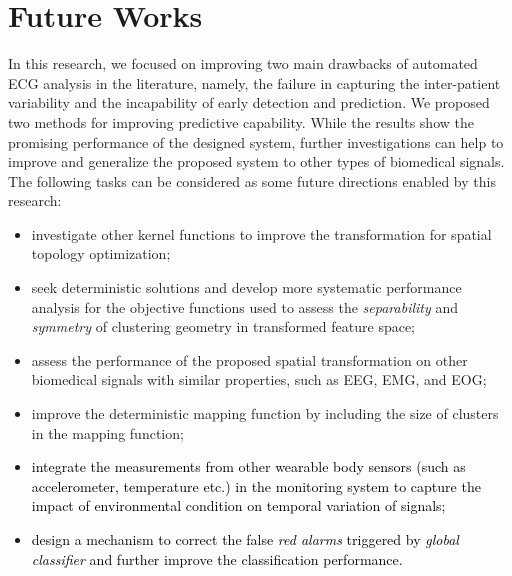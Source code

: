 \section{Future Works}
In this research, we focused on improving two main drawbacks of automated ECG analysis in the literature, namely, the failure in capturing the inter-patient variability and the incapability of early detection and prediction. We proposed two methods for improving predictive capability. While the results show the promising performance of the designed system, further investigations can help to improve and generalize the proposed system to other types of biomedical signals. The following tasks can be considered as some future directions enabled by this research:
 \begin{itemize}
\item investigate other kernel functions to improve the transformation for spatial topology optimization;
\item seek deterministic solutions and develop more systematic performance analysis for the objective functions used to assess the \textit{separability} and \textit{symmetry} of clustering geometry in transformed feature space;
\item assess the performance of the proposed spatial transformation on other biomedical signals with similar properties, such as EEG, EMG, and EOG;
\item  improve the deterministic mapping function by including the size of clusters in the mapping function;
\item \textcolor{black}{integrate the measurements from other wearable body sensors (such as accelerometer, temperature etc.) in the monitoring system to capture the impact of environmental condition on temporal variation of signals;
}
\item \textcolor{black}{design a mechanism to correct the false \textit{red alarms} triggered by \textit{global classifier} and further improve the classification performance.
}
\end{itemize}

